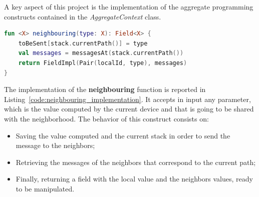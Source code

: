 A key aspect of this project is the implementation of the aggregate programming constructs contained in the \textit{AggregateContext} class.
\begin{lstlisting}[caption={Neighbouring implementation}, captionpos=b, language=Kotlin, label={code:neighbouring_implementation}]
fun <X> neighbouring(type: X): Field<X> {
    toBeSent[stack.currentPath()] = type
    val messages = messagesAt(stack.currentPath())
    return FieldImpl(Pair(localId, type), messages)
}
\end{lstlisting}
The implementation of the \textbf{neighbouring} function is reported in Listing~\ref{code:neighbouring_implementation}. It accepts in input any parameter, which is the value computed by the current device and that is going to be shared with the neighborhood.\newline 
The behavior of this construct consists on:
\begin{itemize}
    \item Saving the value computed and the current stack in order to send the message to the neighbors;
    \item Retrieving the messages of the neighbors that correspond to the current path;
    \item Finally, returning a field with the local value and the neighbors values, ready to be manipulated.
\end{itemize}

